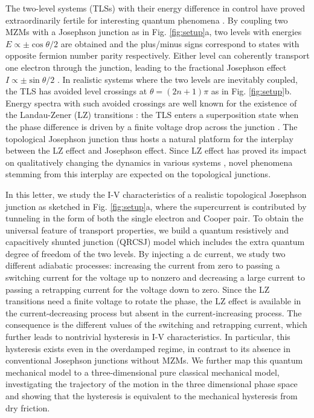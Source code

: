 \documentclass[aps,prl,twocolumn,showpacs,showpacs,10pt,superscriptaddress]{revtex4-1}
\begin{document}
The two-level systems (TLSs) with their energy difference in control have proved extraordinarily fertile for interesting quantum phenomena \cite{AllenBook,Chuang05,Morsch06,noripr}. By coupling two MZMs with a Josephson junction as in Fig. \ref{fig:setup}a, two levels with energies $E\propto\pm\cos\theta/2$ are obtained and the plus/minus signs correspond to states with opposite fermion number parity respectively. Either level can coherently transport one electron through the junction, leading to the fractional Josephson effect $I \propto \pm \sin \theta/2$ \cite{fuprb09,Lutchyn10,oregprl10}. In realistic systems where the two levels are inevitably coupled, the TLS has avoided level crossings at $\theta = (2n+1)\pi$ as in Fig. \ref{fig:setup}b. Energy spectra with such avoided crossings are well known for the existence of the Landau-Zener (LZ) transitions \cite{LZ}: the TLS enters a superposition state when the phase difference is driven by a finite voltage drop across the junction \cite{wangpra}. The topological Josephson junction thus hosts a natural platform for the interplay between the LZ effect and Josephson effect. Since LZ effect has proved its impact on qualitatively changing the dynamics in various systems \cite{Chen11,Liu13,ludwig,higuchi,Law16,wubiao}, novel phenomena stemming from this interplay are expected on the topological junctions.



In this letter, we study the I-V characteristics of a realistic topological Josephson junction as sketched in Fig. \ref{fig:setup}a, where the supercurrent is contributed by tunneling in the form of both the single electron and Cooper pair. To obtain the universal feature of transport properties, we build a quantum resistively and capacitively shunted junction (QRCSJ) model which includes the extra quantum degree of freedom of the two levels. By injecting a dc current, we study two different adiabatic processes: increasing the current from zero to passing a switching current for the voltage up to nonzero and decreasing a large current to passing a retrapping current for the voltage down to zero. Since the LZ transitions need a finite voltage to rotate the phase, the LZ effect is available in the current-decreasing process but absent in the current-increasing process. The consequence is the different values of the switching and retrapping current, which further leads to nontrivial hysteresis in I-V characteristics. In particular, this hysteresis exists even in the overdamped regime, in contrast to its absence in conventional Josephson junctions without MZMs. We further map this quantum mechanical model to a three-dimensional pure classical mechanical model, investigating the trajectory of the motion in the three dimensional phase space and showing that the hysteresis is equivalent to the mechanical hysteresis from dry friction.
\end{document}
